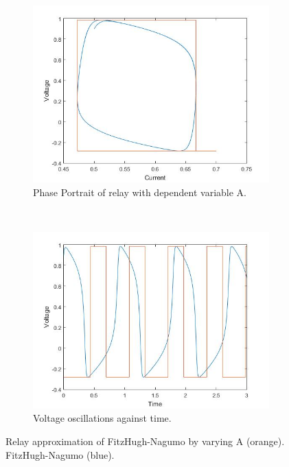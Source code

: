 \documentclass[a4paper]{article}
\begin{document}
\begin{figure}[h!]
    \centering
    \begin{subfigure}[t]{0.49\textwidth}
        \includegraphics[width=\textwidth]{fitz_relay_change_A_hysteresis}
        \caption{Phase Portrait of relay with dependent variable A.}
        \label{fn_match_voltage_time_pp}
    \end{subfigure}
    ~ %
    \begin{subfigure}[t]{0.49\textwidth}
        \includegraphics[width=\textwidth]{fitz_relay_change_A_voltage_time}
        \caption{Voltage oscillations against time.}
        \label{fn_match_voltage_time_vt}
    \end{subfigure}
\caption{Relay approximation of FitzHugh-Nagumo by varying A (orange). FitzHugh-Nagumo (blue).}
\label{fn_match_voltage_time}
\end{figure}
\end{document}
